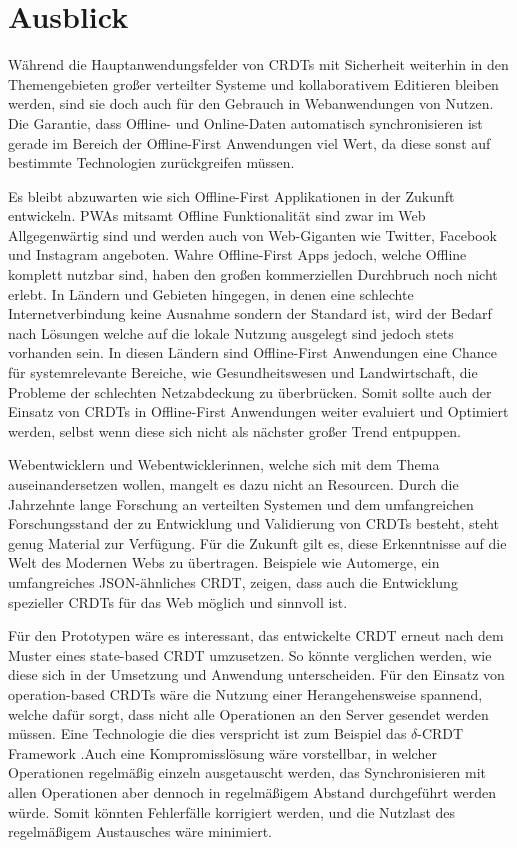 \documentclass[a4paper, 12pt]{scrreprt}
\begin{document}
\section{Ausblick}

Während die Hauptanwendungsfelder von CRDTs mit Sicherheit weiterhin in den Themengebieten großer verteilter Systeme und kollaborativem Editieren bleiben werden, sind sie doch auch für den Gebrauch in Webanwendungen von Nutzen. Die Garantie, dass Offline- und Online-Daten automatisch synchronisieren ist gerade im Bereich der Offline-First Anwendungen viel Wert, da diese sonst auf bestimmte Technologien zurückgreifen müssen.

Es bleibt abzuwarten wie sich Offline-First Applikationen in der Zukunft entwickeln. PWAs mitsamt Offline Funktionalität sind zwar im Web Allgegenwärtig sind und werden auch von Web-Giganten wie Twitter, Facebook und Instagram angeboten. Wahre Offline-First Apps jedoch, welche Offline komplett nutzbar sind, haben den großen kommerziellen Durchbruch noch nicht erlebt. In Ländern und Gebieten hingegen, in denen eine schlechte Internetverbindung keine Ausnahme sondern der Standard ist, wird der Bedarf nach Lösungen welche auf die lokale Nutzung ausgelegt sind jedoch stets vorhanden sein. In diesen Ländern sind Offline-First Anwendungen eine Chance für systemrelevante Bereiche, wie Gesundheitswesen und Landwirtschaft, die Probleme der schlechten Netzabdeckung zu überbrücken. Somit sollte auch der Einsatz von CRDTs in Offline-First Anwendungen weiter evaluiert und Optimiert werden, selbst wenn diese sich nicht als nächster großer Trend entpuppen. 

Webentwicklern und Webentwicklerinnen, welche sich mit dem Thema auseinandersetzen wollen, mangelt es dazu nicht an Resourcen. Durch die Jahrzehnte lange Forschung an verteilten Systemen und dem umfangreichen Forschungsstand der zu Entwicklung und Validierung von CRDTs besteht, steht genug Material zur Verfügung. Für die Zukunft gilt es, diese Erkenntnisse auf die Welt des Modernen Webs zu übertragen. Beispiele wie Automerge, ein umfangreiches JSON-ähnliches CRDT, zeigen, dass auch die Entwicklung spezieller CRDTs für das Web möglich und sinnvoll ist. 

Für den Prototypen wäre es interessant, das entwickelte CRDT erneut nach dem Muster eines state-based CRDT umzusetzen. So könnte verglichen werden, wie diese sich in der Umsetzung und Anwendung unterscheiden. Für den Einsatz von operation-based CRDTs wäre die Nutzung einer Herangehensweise spannend, welche dafür sorgt, dass nicht alle Operationen an den Server gesendet werden müssen. Eine Technologie die dies verspricht ist zum Beispiel das $\delta$-CRDT Framework \autocite{articleDeltaCRDT}.Auch eine Kompromisslösung wäre vorstellbar, in welcher Operationen regelmäßig einzeln ausgetauscht werden, das Synchronisieren mit allen Operationen aber dennoch in regelmäßigem Abstand durchgeführt werden würde. Somit könnten Fehlerfälle korrigiert werden, und die Nutzlast des regelmäßigem Austausches wäre minimiert.
\end{document}
